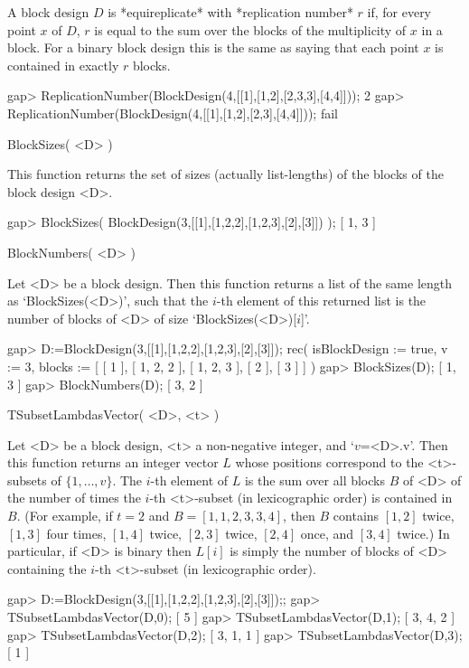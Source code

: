 A block design $D$ is *equireplicate* with *replication number* $r$ if,
for every point $x$ of $D$, $r$ is equal to the sum over the blocks of
the multiplicity of $x$ in a block. For a binary block design this is
the same as saying that each point $x$ is contained in exactly $r$ blocks.

\beginexample
gap> ReplicationNumber(BlockDesign(4,[[1],[1,2],[2,3,3],[4,4]]));
2
gap> ReplicationNumber(BlockDesign(4,[[1],[1,2],[2,3],[4,4]]));  
fail
\endexample



\>BlockSizes( <D> )

This function returns the set of sizes (actually list-lengths) of the 
blocks of the block design <D>.

\beginexample
gap> BlockSizes( BlockDesign(3,[[1],[1,2,2],[1,2,3],[2],[3]]) );  
[ 1, 3 ]
\endexample



\>BlockNumbers( <D> )

Let <D> be a block design. Then this function returns a list of
the same length as `BlockSizes(<D>)', such that the $i$-th element 
of this returned list is the number of blocks of <D> of size
`BlockSizes(<D>)[$i$]'.

\beginexample
gap> D:=BlockDesign(3,[[1],[1,2,2],[1,2,3],[2],[3]]); 
rec( isBlockDesign := true, v := 3, 
  blocks := [ [ 1 ], [ 1, 2, 2 ], [ 1, 2, 3 ], [ 2 ], [ 3 ] ] )
gap> BlockSizes(D);
[ 1, 3 ]
gap> BlockNumbers(D);
[ 3, 2 ]
\endexample



\>TSubsetLambdasVector( <D>, <t> )

Let <D> be a block design, <t> a non-negative integer, and 
`$v$=<D>.v'. Then this function returns an integer vector $L$ 
whose positions correspond to the <t>-subsets of $\{1,\ldots,v\}$.
The $i$-th element of $L$ is the sum over all blocks $B$ of <D> 
of the number of times the $i$-th <t>-subset (in lexicographic order) 
is contained in $B$. (For example, if $t=2$ and $B=[1,1,2,3,3,4]$, then
$B$ contains $[1,2]$ twice, $[1,3]$ four times, $[1,4]$ twice,
$[2,3]$ twice, $[2,4]$ once, and $[3,4]$ twice.) In particular, 
if <D> is binary then $L[i]$ is simply the number of blocks of <D> 
containing the $i$-th <t>-subset (in lexicographic order).
 
\beginexample
gap> D:=BlockDesign(3,[[1],[1,2,2],[1,2,3],[2],[3]]);;
gap> TSubsetLambdasVector(D,0);
[ 5 ]
gap> TSubsetLambdasVector(D,1);
[ 3, 4, 2 ]
gap> TSubsetLambdasVector(D,2);
[ 3, 1, 1 ]
gap> TSubsetLambdasVector(D,3);
[ 1 ]
\endexample



